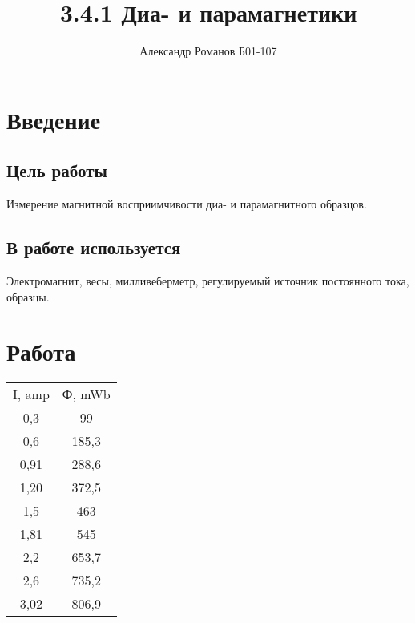 \documentclass{article}
\author{Александр Романов Б01-107}
\date{}
\title{3.4.1 Диа- и парамагнетики}
\begin{document}
\maketitle

\section{Введение}

    \subsection{Цель работы}
    Измерение магнитной восприимчивости диа- и парамагнитного образцов.

    \subsection{В работе используется}
    Электромагнит, весы, милливеберметр, регулируемый источник постоянного тока, образцы.

\section{Работа}

    \begin{table}[H]
    \begin{tabular}{|c|c|}
        I, amp & Ф, mWb \\
        0,3  & 99     \\
        0,6  & 185,3  \\
        0,91 & 288,6  \\
        1,20 & 372,5  \\
        1,5  & 463    \\
        1,81 & 545    \\
        2,2  & 653,7  \\
        2,6  & 735,2  \\
        3,02 & 806,9 
    \end{tabular}
    \end{table}
\end{document}
